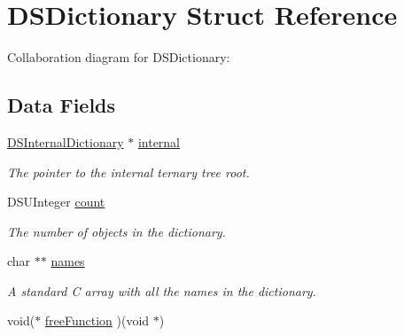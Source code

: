 \hypertarget{struct_d_s_dictionary}{
\section{DSDictionary Struct Reference}
\label{struct_d_s_dictionary}
}


Collaboration diagram for DSDictionary:\subsection*{Data Fields}
\begin{DoxyCompactItemize}
\item 
\hypertarget{struct_d_s_dictionary_a5e1e0fc0452d117d13cd6629dd707572}{
\hyperlink{struct__var_dictionary}{DSInternalDictionary} $\ast$ \hyperlink{struct_d_s_dictionary_a5e1e0fc0452d117d13cd6629dd707572}{internal}}
\label{struct_d_s_dictionary_a5e1e0fc0452d117d13cd6629dd707572}

\begin{DoxyCompactList}\small\item\em The pointer to the internal ternary tree root. \item\end{DoxyCompactList}\item 
\hypertarget{struct_d_s_dictionary_a6e9cf56a395f2344f3c8b59e09d6ae69}{
DSUInteger \hyperlink{struct_d_s_dictionary_a6e9cf56a395f2344f3c8b59e09d6ae69}{count}}
\label{struct_d_s_dictionary_a6e9cf56a395f2344f3c8b59e09d6ae69}

\begin{DoxyCompactList}\small\item\em The number of objects in the dictionary. \item\end{DoxyCompactList}\item 
\hypertarget{struct_d_s_dictionary_a26fc633cf551a2621e172633486c85ef}{
char $\ast$$\ast$ \hyperlink{struct_d_s_dictionary_a26fc633cf551a2621e172633486c85ef}{names}}
\label{struct_d_s_dictionary_a26fc633cf551a2621e172633486c85ef}

\begin{DoxyCompactList}\small\item\em A standard C array with all the names in the dictionary. \item\end{DoxyCompactList}\item 
\hypertarget{struct_d_s_dictionary_a6a6893789caa66d02e3a46750bd6ff50}{
void($\ast$ \hyperlink{struct_d_s_dictionary_a6a6893789caa66d02e3a46750bd6ff50}{freeFunction} )(void $\ast$)}
\label{struct_d_s_dictionary_a6a6893789caa66d02e3a46750bd6ff50}


\end{DoxyCompactItemize}

